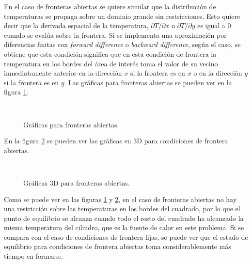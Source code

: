 \documentclass{article}
\begin{document}
En el caso de fronteras abiertas se quiere simular que la distribución de temperaturas se propaga sobre un dominio grande sin restricciones. Esto quiere decir que la derivada espacial de la temperatura, $\partial T/ \partial x$ o $\partial T/ \partial y$ es igual a 0 cuando se evalúa sobre la frontera. Si se implementa una aproximación por diferencias finitas con \textit{forward difference} o \textit{backward difference}, según el caso, se obtiene que esta condición significa que en esta condición de frontera la temperatura en los bordes del área de interés toma el valor de su vecino inmediatamente anterior en la dirección $x$ si la frontera es en $x$ o en la dirección $y$ si la frontera es en $y$. Las gráficas para fronteras abiertas se pueden ver en la figura \ref{fig:abiertas}.
\begin{figure}[htbp]
\centering
     \\
    \caption{Gráficas para fronteras abiertas.}
    \label{fig:abiertas}
\end{figure}
En la figura \ref{fig:abiertas3D} se pueden ver las gráficas en 3D para condiciones de frontera abiertas.
\begin{figure}[htbp]
\centering
     \\
    \caption{Gráficas 3D para fronteras abiertas.}
    \label{fig:abiertas3D}
\end{figure}

Como se puede ver en las figuras \ref{fig:abiertas} y \ref{fig:abiertas3D}, en el caso de fronteras abiertas no hay una restricción sobre las temperaturas en los bordes del cuadrado, por lo que el punto de equilibrio se alcanza cuando todo el resto del cuadrado ha alcanzado la misma temperatura del cilindro, que es la fuente de calor en este problema. Si se compara con el caso de condiciones de frontera fijas, se puede ver que el estado de equilibrio para condiciones de frontera abiertas toma considerablemente más tiempo en formarse.
\end{document}
